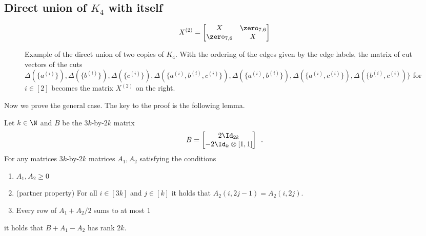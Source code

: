 \subsection{Direct union of $K_4$ with itself}
\begin{figure}
\centering
\begin{minipage}{.55\textwidth}
\centering
{}
\end{minipage}
\begin{minipage}{.4\textwidth}
\centering
\[
X^{(2)} =
\begin{bmatrix}
X & \zero_{7,6} \\
\zero_{7,6} & X
\end{bmatrix}
\]
\end{minipage}
\caption{Example of the direct union of two copies of $K_4$.  With the ordering of the edges given by the edge labels,
the matrix of cut vectors of the cuts $\Delta(\{a^{(i)}\}), \Delta(\{b^{(i)}\}), \Delta(\{c^{(i)}\}), \Delta(\{a^{(i)},b^{(i)},c^{(i)}\}), \Delta(\{a^{(i)},b^{(i)}\}), \Delta(\{a^{(i)},c^{(i)}\}), \Delta(\{b^{(i)},c^{(i)})\}$
for $i \in [2]$ becomes the matrix $X^{(2)}$ on the right.}
\label{fig:K42}
\end{figure}


Now we prove the general case.  The key to the proof is the following lemma.
\begin{lemma}
\label{lem:2k}
Let $k \in \N$ and $B$ be the $3k$-by-$2k$ matrix
\[
B = \begin{bmatrix} 2 \Id_{2k} \\ -2 \Id_k \otimes [1,1] \end{bmatrix} \enspace .
\]
For any matrices $3k$-by-$2k$ matrices $A_1, A_2$ satisfying the conditions
\begin{enumerate}
\item $A_1, A_2 \ge 0$
\item (partner property) For all $i \in [3k]$ and $j \in [k]$ it holds that $A_2(i,2j-1) = A_2(i,2j)$.
\item Every row of $A_1 + A_2/2$ sums to at most $1$
\end{enumerate}
it holds that $B +A_1 - A_2$ has rank $2k$.
\end{lemma}

